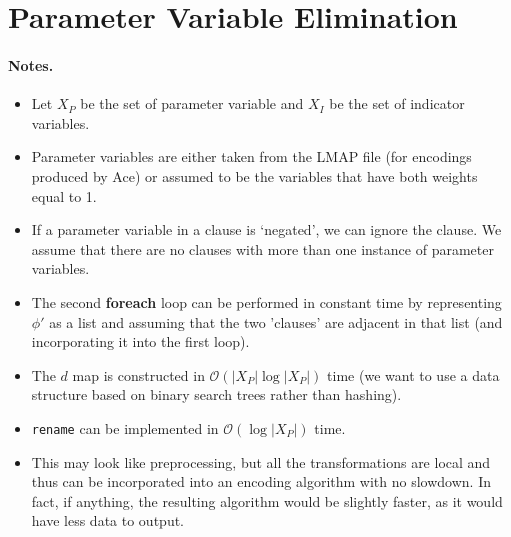 \documentclass{article}
\theoremstyle{definition}
\theoremstyle{remark}
\begin{document}
\section{Parameter Variable Elimination}

\paragraph{Notes.}
\begin{itemize}
\item Let $X_P$ be the set of parameter variable and $X_I$ be the set of
  indicator variables.
\item Parameter variables are either taken from the LMAP file (for encodings
  produced by Ace) or assumed to be the variables that have both weights equal
  to 1.
\item If a parameter variable in a clause is `negated', we can ignore the
  clause. We assume that there are no clauses with more than one instance of
  parameter variables.
\item The second \textbf{foreach} loop can be performed in constant time by
  representing $\phi'$ as a list and assuming that the two 'clauses' are
  adjacent in that list (and incorporating it into the first loop).
\item The $d$ map is constructed in $\mathcal{O}(|X_P|\log|X_P|)$ time (we want
  to use a data structure based on binary search trees rather than hashing).
\item \texttt{rename} can be implemented in $\mathcal{O}(\log |X_P|)$ time.
\item This may look like preprocessing, but all the transformations are local
  and thus can be incorporated into an encoding algorithm with no slowdown. In
  fact, if anything, the resulting algorithm would be slightly faster, as it
  would have less data to output.
\end{itemize}
\end{document}
